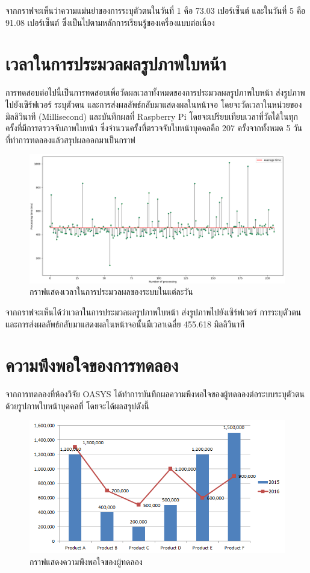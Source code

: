 \indent จากกราฟจะเห็นว่าความแม่นยำของการระบุตัวตนในวันที่ 1 คือ 73.03 เปอร์เซ็นต์ และในวันที่ 5 คือ 91.08 เปอร์เซ็นต์ ซึ่งเป็นไปตามหลักการเรียนรู้ของเครื่องแบบต่อเนื่อง


\section{เวลาในการประมวลผลรูปภาพใบหน้า}
การทดสอบต่อไปนี้เป็นการทดสอบเพื่อวัดผลเวลาทั้งหมดของการประมวลผลรูปภาพใบหน้า ส่งรูปภาพไปยังเซิร์ฟเวอร์ ระบุตัวตน และการส่งผลลัพธ์กลับมาแสดงผลในหน้าจอ
โดยจะวัดเวลาในหน่วยของมิลลิวินาที (Millisecond) และบันทึกผลที่ Raspberry Pi โดยจะเปรียบเทียบเวลาที่วัดได้ในทุกครั้งที่มีการตรวจจับภาพใบหน้า 
ซึ่งจำนวนครั้งที่ตรวจจับใบหน้าบุคคลคือ 207 ครั้งจากทั้งหมด 5 วันที่ทำการทดลองแล้วสรุปผลออกมาเป็นกราฟ
  
\begin{figure}[!ht]
  \begin{center}
    \includegraphics[scale=.5]{pic/Time_1.png}
    \caption[กราฟแสดงเวลาในการประมวลผลของระบบในแต่ละวัน]{กราฟแสดงเวลาในการประมวลผลของระบบในแต่ละวัน}
    \label{fig:time_graph}
  \end{center}
\end{figure}
\newpage
\indent จากกราฟจะเห็นได้ว่าเวลาในการประมวลผลรูปภาพใบหน้า ส่งรูปภาพไปยังเซิร์ฟเวอร์ การระบุตัวตน และการส่งผลลัพธ์กลับมาแสดงผลในหน้าจอนั้นมีเวลาเฉลี่ย 455.618 มิลลิวินาที



\section{ความพึงพอใจของการทดลอง}
จากการทดลองที่ห้องวิจัย OASYS ได้ทำการบันทึกผลความพึงพอใจของผู้ทดลองต่อระบบระบุตัวตนด้วยรูปภาพใบหน้าบุคคลที่ โดยจะได้ผลสรุปดังนี้

\begin{figure}[!ht]
    \begin{center}
      \includegraphics[scale=.5]{pic/bar_graph.png}
      \caption[กราฟแสดงความพึงพอใจของผู้ทดลอง]{กราฟแสดงความพึงพอใจของผู้ทดลอง}
      \label{fig:bar_graph}
    \end{center}
  \end{figure}